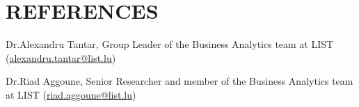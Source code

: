 \documentclass[11pt,a4paper,roman]{moderncv}        %
\begin{document}
{\begin{parcolumns}{2}
\colplacechunks
{}

\end{parcolumns}





%
\vspace{-1.3\baselineskip}
\section{REFERENCES}
Dr.Alexandru Tantar, Group Leader of the Business Analytics team at LIST  (\href{mailto:alexandru.tantar@list.lu}{alexandru.tantar@list.lu}) 

\vspace{0.3cm}
Dr.Riad Aggoune, Senior Researcher and member of the Business Analytics team at LIST (\href{mailto:riad.aggoune@list.lu}{riad.aggoune@list.lu}) 
%      
%      
}
\nocite{*}



\end{document}
